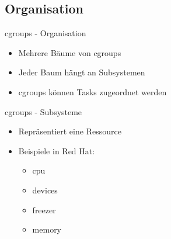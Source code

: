 \documentclass[14pt]{beamer}
\begin{document}
    \subsection{Organisation}
    \begin{frame}{cgroups - Organisation}
    	\begin{itemize}
        \item Mehrere Bäume von cgroups
        \item Jeder Baum hängt an Subsystemen
        \item cgroups können Tasks zugeordnet werden
    	\end{itemize}
    \end{frame}
    \begin{frame}{cgroups - Subsysteme}
    	\begin{itemize}
        \item Repräsentiert eine Ressource
        \item Beispiele in Red Hat:
        	\begin{itemize}
        	\item cpu
            \item devices
            \item freezer
            \item memory
        	\end{itemize}
    	\end{itemize}
    \end{frame}
    
\end{document}
